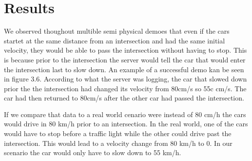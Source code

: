 \section{Results}

We observed thoughout multible semi physical demoes that even if the cars startet at the same distance from an intersection and had the same initial velocity, they would be able to pass the intersection without having to stop. This is because prior to the intersection the server would tell the car that would enter the intersection last to slow down. An example of a successful demo kan be seen in figure 3.6. According to what the server was logging, the car that slowed down prior the the intersection had changed its velocity from 80cm/s so 55c cm/s. The car had then returned to 80cm/s after the other car had passed the intersection.

If we compare that data to a real world cenario were instead of 80 cm/h the cars would drive in 80 km/h prior to an intersection. In the real world, one of the cars would have to stop before a traffic light while the other could drive past the intersection. This would lead to a velocity change from 80 km/h to 0. In our scenario the car would only have to slow down to 55 km/h.   



